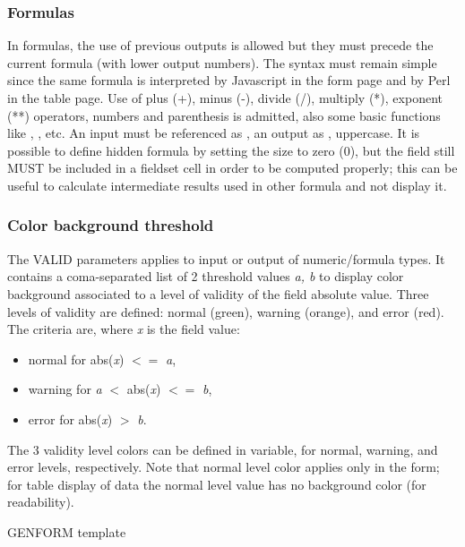\subsubsection{Formulas}

In formulas, the use of previous outputs is allowed but they must precede the current formula (with lower output numbers). The syntax must remain simple since the same formula is interpreted by Javascript in the form page and by Perl in the table page. Use of plus (+), minus (-), divide (/), multiply (*), exponent (**) operators, numbers and parenthesis is admitted, also some basic functions like , , etc. An input must be referenced as , an output as , uppercase. It is possible to define hidden formula by setting the size to zero (0), but the field still MUST be included in a fieldset cell in order to be computed properly; this can be useful to calculate intermediate results used in other formula and not display it.
 
\subsubsection{Color background threshold}

The VALID parameters applies to input or output of numeric/formula types. It contains a coma-separated list of 2 threshold values {\it a, b} to display color background associated to a level of validity of the field absolute value. Three levels of validity are defined: normal (green), warning (orange), and error (red). The criteria are, where {\it x} is the field value:
\begin{itemize}
	\item normal for abs({\it x}) $<=$ {\it a},
	\item warning for {\it a} $<$ abs({\it x}) $<=$ {\it b},
	\item error for abs({\it x}) $>$ {\it b}.
\end{itemize}

The 3 validity level colors can be defined in  variable, for normal, warning, and error levels, respectively. Note that normal level color applies only in the form; for table display of data the normal level value has no background color (for readability).




\begin{table}[htp]
\caption{GENFORM template}
\label{genform_template}

\end{table}


